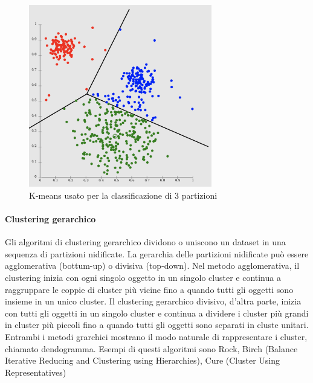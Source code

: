 \documentclass[12pt, a4paper, italian]{report}
\numberwithin{figure}{chapter}
\numberwithin{table}{chapter}
\begin{document}
\begin{figure}[h] \centering
\includegraphics[width=8cm]{C_Partizionale.png}
\caption{K-means usato per la classificazione di 3 partizioni\protect\footnotemark}
\label{fig:qualcosa}
\end{figure}

\paragraph{Clustering gerarchico} 
Gli algoritmi di clustering gerarchico dividono o uniscono un dataset in una sequenza di partizioni nidificate. La gerarchia delle partizioni nidificate può essere agglomerativa (bottum-up) o divisiva (top-down). Nel metodo agglomerativa, il clustering inizia con ogni singolo oggetto in un singolo cluster e continua a raggruppare le coppie di cluster più vicine fino a quando tutti gli oggetti sono insieme in un unico cluster. Il clustering gerarchico divisivo, d'altra parte, inizia con tutti gli oggetti in un singolo cluster e continua a dividere i cluster più grandi in cluster più piccoli fino a quando tutti gli oggetti sono separati in cluste unitari. Entrambi i metodi grarchici mostrano il modo naturale di rappresentare i cluster, chiamato dendogramma. Esempi di questi algoritmi sono Rock, Birch (Balance Iterative Reducing and Clustering using Hierarchies), Cure (Cluster Using Representatives)
\end{document}
